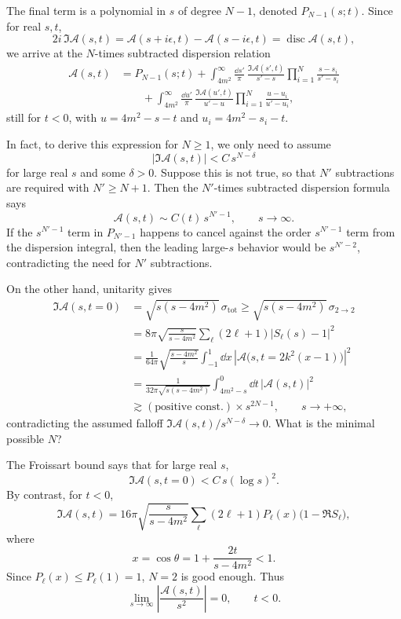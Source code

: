 The final term is a polynomial in \(s\) of degree \(N-1\), denoted
\(P_{N-1}(s;t)\).  Since for real \(s,t\),
\[
  2i\,\Im\mathcal A(s,t)
  =
  \mathcal A(s+i\epsilon,t)-\mathcal A(s-i\epsilon,t)
  =
  \operatorname{disc}\mathcal A(s,t),
\]
we arrive at the \(N\)-times subtracted dispersion relation
\[
\begin{aligned}
  \mathcal A(s,t)
  &=
  P_{N-1}(s;t)
  +\int_{4m^2}^{\infty}\frac{\dd s'}{\pi}\,
  \frac{\Im\mathcal A(s',t)}{s'-s}
  \prod_{i=1}^N\frac{s-s_i}{s'-s_i}
  \\
  &\qquad
  +\int_{4m^2}^{\infty}\frac{\dd u'}{\pi}\,
  \frac{\Im\mathcal A(u',t)}{u'-u}
  \prod_{i=1}^N\frac{u-u_i}{u'-u_i},
\end{aligned}
\]
still for \(t<0\), with \(u=4m^2-s-t\) and
\(u_i=4m^2-s_i-t\).

In fact, to derive this expression for \(N\geq 1\), we only need to
assume
\[
  \left|\Im\mathcal A(s,t)\right|
  < C\,s^{N-\delta}
\]
for large real \(s\) and some \(\delta>0\).  Suppose this is not true,
so that \(N'\) subtractions are required with \(N'\geq N+1\).  Then the
\(N'\)-times subtracted dispersion formula says
\[
  \mathcal A(s,t)\sim C(t)\,s^{N'-1},
  \qquad s\to\infty.
\]
If the \(s^{N'-1}\) term in \(P_{N'-1}\) happens to cancel against the
order \(s^{N'-1}\) term from the dispersion integral, then the leading
large-\(s\) behavior would be \(s^{N'-2}\), contradicting the need for
\(N'\) subtractions.

On the other hand, unitarity gives
\[
\begin{aligned}
  \Im\mathcal A(s,t=0)
  &=
  \sqrt{s(s-4m^2)}\,\sigma_{\mathrm{tot}}
  \geq
  \sqrt{s(s-4m^2)}\,\sigma_{2\to2}
  \\
  &=
  8\pi\sqrt{\frac{s}{s-4m^2}}
  \sum_{\ell}(2\ell+1)\left|S_\ell(s)-1\right|^2
  \\
  &=
  \frac{1}{64\pi}\sqrt{\frac{s-4m^2}{s}}
  \int_{-1}^{1}\dd x\,
  \left|
    \mathcal A\bigl(s,t=2k^2(x-1)\bigr)
  \right|^2
  \\
  &=
  \frac{1}{32\pi\sqrt{s(s-4m^2)}}
  \int_{4m^2-s}^{0}\dd t\,|\mathcal A(s,t)|^2
  \\
  &\gtrsim
  (\text{positive const.})\times s^{2N-1},
  \qquad s\to+\infty,
\end{aligned}
\]
contradicting the assumed falloff
\(\Im\mathcal A(s,t)/s^{N-\delta}\to0\).  What is the minimal possible
\(N\)?

The Froissart bound says that for large real \(s\),
\[
  \Im\mathcal A(s,t=0)<C\,s(\log s)^2 .
\]
By contrast, for \(t<0\),
\[
  \Im\mathcal A(s,t)
  =
  16\pi\sqrt{\frac{s}{s-4m^2}}
  \sum_\ell (2\ell+1)P_\ell(x)\bigl(1-\Re S_\ell\bigr),
\]
where
\[
  x=\cos\theta=1+\frac{2t}{s-4m^2}<1.
\]
Since \(P_\ell(x)\leq P_\ell(1)=1\), \(N=2\) is good enough.  Thus
\[
  \lim_{s\to\infty}
  \left|
    \frac{\mathcal A(s,t)}{s^2}
  \right|
  =0,
  \qquad t<0.
\]

